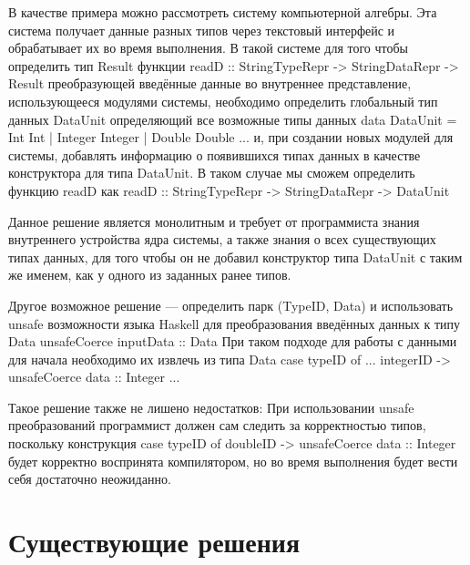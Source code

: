 \documentclass[a4paper,12pt]{article}
\newenvironment{code}{\footnotesize\verbatim}{\endverbatim\normalsize}
\begin{document}
В качестве примера можно рассмотреть систему компьютерной алгебры. Эта
система получает данные разных типов через текстовый интерфейс и
обрабатывает их во время выполнения. В такой системе для того чтобы
определить тип Result функции
\begin{code}
  readD :: StringTypeRepr -> StringDataRepr -> Result
\end{code}
преобразующей введённые данные во внутреннее представление,
использующееся модулями системы, необходимо определить глобальный тип
данных DataUnit определяющий все возможные типы данных
\begin{code}
data DataUnit = Int Int
              | Integer Integer 
              | Double Double 
              ...
\end{code}
и, при создании новых модулей для системы, добавлять информацию о
появившихся типах данных в качестве конструктора для типа DataUnit. В
таком случае мы сможем определить функцию readD как
\begin{code}
  readD :: StringTypeRepr -> StringDataRepr -> DataUnit
\end{code}

Данное решение является монолитным и требует от программиста знания
внутреннего устройства ядра системы, а также знания о всех
существующих типах данных, для того чтобы он не добавил конструктор
типа DataUnit с таким же именем, как у одного из заданных ранее типов.

Другое возможное решение --- определить парк (TypeID, Data) и
использовать unsafe возможности языка Haskell для преобразования
введённых данных к типу Data
\begin{code}
unsafeCoerce inputData :: Data
\end{code}
При таком подходе для работы с данными для начала необходимо их извлечь из типа Data
\begin{code}
case typeID of
  ...
  integerID -> unsafeCoerce data :: Integer
  ...
\end{code}

Такое решение также не лишено недостатков: При использовании unsafe
преобразований программист должен сам следить за корректностью типов,
поскольку конструкция
\begin{code}
case typeID of
  doubleID -> unsafeCoerce data :: Integer
\end{code}
будет корректно воспринята компилятором, но во время выполнения будет
вести себя достаточно неожиданно.

\section{Существующие решения}
\end{document}
